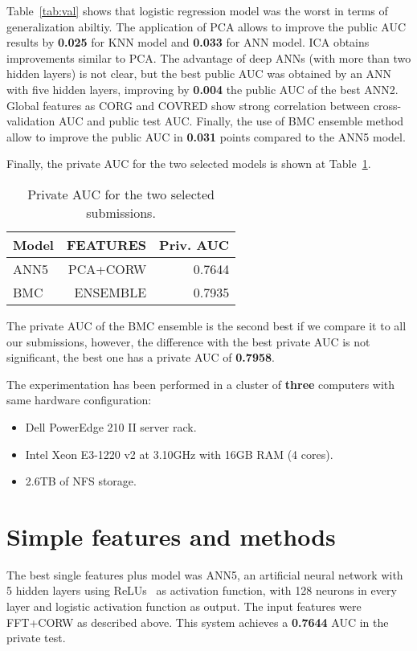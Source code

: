 \documentclass[a4paper,english,twoside]{article}
\begin{document}
Table~\ref{tab:val} shows that logistic regression model was the worst in
terms of generalization abiltiy. The application of PCA allows to
improve the public AUC results by \textbf{0.025} for KNN model and
\textbf{0.033} for ANN model. ICA obtains improvements similar to PCA.
The advantage of deep ANNs (with more than two hidden layers) is not
clear, but the best public AUC was obtained by an ANN with five hidden
layers, improving by \textbf{0.004} the public AUC of the best ANN2.
Global features as CORG and COVRED show strong correlation between
cross-validation AUC and public test AUC. Finally, the use of BMC
ensemble method allow to improve the public AUC in \textbf{0.031} points
compared to the ANN5 model.

Finally, the private AUC for the two selected models is shown at
Table~\ref{tab:private}.

\begin{table}
  \centering
  \begin{tabular}{|l|r|r|}
    \hline
    Model & FEATURES & Priv. AUC\\
    \hline
    \hline
    ANN5 & PCA+CORW & 0.7644\\
    BMC & ENSEMBLE & 0.7935\\
    \hline
  \end{tabular}
  \caption{Private AUC for the two selected submissions.\label{tab:private}}
\end{table}

The private AUC of the BMC ensemble is the second best if we compare it
to all our submissions, however, the difference with the best private
AUC is not significant, the best one has a private AUC of
\textbf{0.7958}.

The experimentation has been performed in a cluster of \textbf{three}
computers with same hardware configuration:

\begin{itemize}
\item
  Dell PowerEdge 210 II server rack.
\item
  Intel Xeon E3-1220 v2 at 3.10GHz with 16GB RAM (4 cores).
\item
  2.6TB of NFS storage.
\end{itemize}

\section{Simple features and methods}\label{simple-features-and-methods}

The best single features plus model was ANN5, an artificial neural
network with 5 hidden layers using ReLUs~\cite{2011:glorot:aistats}
as activation function, with 128 neurons in every layer and logistic
activation function as output. The input features were FFT+CORW as
described above. This system achieves a \textbf{0.7644} AUC in the
private test.



\end{document}
